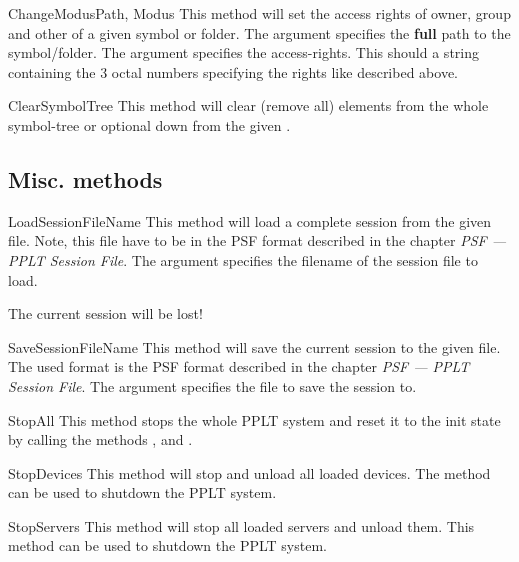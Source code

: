 \begin{methoddesc}[System]{ChangeModus}{Path, Modus}
This method will set the access rights of owner, group and other
of a given symbol or folder. The argument  specifies the 
\textbf{full} path to the symbol/folder. The argument  specifies
the access-rights. This should a string containing the 3 octal numbers 
specifying the rights like described above.
\end{methoddesc}


\begin{methoddesc}[System]{ClearSymbolTree}{}
This method will clear (remove all) elements from the whole symbol-tree or
optional down from the given .
\end{methoddesc}




\subsection{Misc. methods}
\begin{methoddesc}[System]{LoadSession}{FileName}
This method will load a complete session from the given file. Note, this file
have to be in the PSF format described in the chapter 
\emph{PSF --- PPLT Session File}. The argument  specifies the
filename of the session file to load.
\begin{notice} 
The current session will be lost! 
\end{notice}
\end{methoddesc}


\begin{methoddesc}[System]{SaveSession}{FileName}
This method will save the current session to the given file. The used
format is the PSF format described in the chapter 
\emph{PSF --- PPLT Session File}. The argument  specifies
the file to save the session to.
\end{methoddesc}


\begin{methoddesc}[System]{StopAll}{}
This method stops the whole PPLT system and reset it to the init state by calling  the 
methods ,  and
.
\end{methoddesc}


\begin{methoddesc}[System]{StopDevices}{}
This method will stop and unload all loaded devices. The method can be used to
shutdown the PPLT system.
\end{methoddesc}


\begin{methoddesc}[System]{StopServers}{}
This method will stop all loaded servers and unload them. This method can be used 
to shutdown the PPLT system.
\end{methoddesc}

